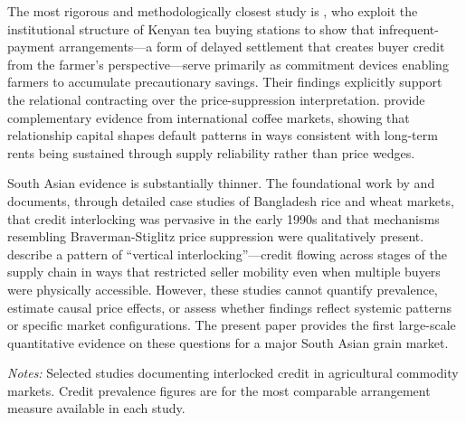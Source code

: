 \documentclass[authoryear,preprint,review,12pt]{elsarticle}
\begin{document}
The most rigorous and methodologically closest study is \citet{casaburi_macchiavello2019},
who exploit the institutional structure of Kenyan tea buying stations to
show that infrequent-payment arrangements---a form of delayed settlement
that creates buyer credit from the farmer's perspective---serve primarily
as commitment devices enabling farmers to accumulate precautionary savings.
Their findings explicitly support the relational contracting over the
price-suppression interpretation. \citet{blouin_macchiavello2019} provide
complementary evidence from international coffee markets, showing that
relationship capital shapes default patterns in ways consistent with
long-term rents being sustained through supply reliability rather than
price wedges.

South Asian evidence is substantially thinner. The foundational work by
\citet{murshid1992} and \citet{crow_murshid1992} documents, through detailed
case studies of Bangladesh rice and wheat markets, that credit interlocking
was pervasive in the early 1990s and that mechanisms resembling Braverman-Stiglitz
price suppression were qualitatively present. \citet{crow_murshid1992}
describe a pattern of ``vertical interlocking''---credit flowing across
stages of the supply chain in ways that restricted seller mobility even
when multiple buyers were physically accessible. However, these studies
cannot quantify prevalence, estimate causal price effects, or assess
whether findings reflect systemic patterns or specific market configurations.
The present paper provides the first large-scale quantitative evidence on
these questions for a major South Asian grain market.

\begin{table}[tp]
  \centering
  \caption{Interlocked Credit in Agricultural Markets: Comparative Evidence}
  \label{tab:comparison}
  \begin{singlespace}
  \small
  \begin{threeparttable}
    
    \begin{tablenotes}\footnotesize
      \item \textit{Notes:} Selected studies documenting interlocked credit
      in agricultural commodity markets. Credit prevalence figures are for
      the most comparable arrangement measure available in each study.
    \end{tablenotes}
  \end{threeparttable}
  \end{singlespace}
\end{table}
\end{document}
